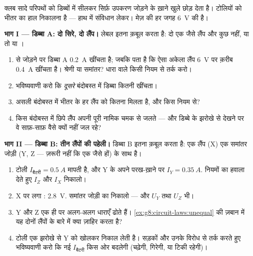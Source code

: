 \begin{problem}[{सप्ताहांत समस्या --- इलेक्ट्रॉनिकी क्लब की सीलबंद
डिब्बों वाली चुनौती; चार नियम बनाम चार पहेलियाँ; महान
लेखा}]\label{pb:g8:circuit-laws:1}
क्लब सादे परिपथों को डिब्बों में सीलकर सिर्फ़ उपकरण जोड़ने के ख़ाने
खुले छोड़ देता है। टोलियों को भीतर का हाल निकालना है --- हाथ में
संविधान लेकर। मेज़ की  हर जगह \qty{6}{V} की है।

\medskip\noindent\textbf{भाग I --- डिब्बा A: दो सिरे, दो लैंप।}
लेबल इतना क़बूल करता है: दो एक जैसे लैंप और कुछ नहीं, या तो 
या ।
\begin{enumerate}
  \item {} से जोड़ने पर डिब्बा A \qty{0.2}{A} खींचता है; जबकि पता
        है कि ऐसा अकेला लैंप \qty{6}{V} पर क़रीब \qty{0.4}{A} खींचता
        है। श्रेणी या समांतर? धारा वाले किसी नियम से तर्क करो।
  \item भविष्यवाणी करो कि \emph{दूसरे} बंदोबस्त में डिब्बा कितनी
        खींचता।
  \item असली बंदोबस्त में भीतर के हर लैंप को कितना  मिलता है,
        और किस  नियम से?
  \item किस बंदोबस्त में छिपे लैंप अपनी पूरी नामिक चमक से जलते ---
        और डिब्बे के झरोखे से देखने पर वे साफ़-साफ़ वैसे क्यों नहीं
        जल रहे?
\end{enumerate}

\medskip\noindent\textbf{भाग II --- डिब्बा B: तीन लैंपों की पहेली।}
डिब्बा B इतना क़बूल करता है: एक लैंप (X) एक समांतर जोड़ी (Y, Z ---
ज़रूरी नहीं कि एक जैसे हों) के साथ  है।
\begin{enumerate}[resume]
  \item टोली $I_{\text{बैटरी}} = \qty{0.5}{A}$ मापती है, और Y के अपने
        परख-ख़ाने पर $I_Y = \qty{0.35}{A}$. नियमों का हवाला देते हुए
        $I_Z$ और $I_X$ निकालो।
  \item X पर लगा : \qty{2.8}{V}. समांतर जोड़ी का 
        निकालो --- और $U_Y$ तथा $U_Z$ भी।
  \item Y और Z एक ही  पर अलग-अलग धाराएँ ढोते हैं।
        \cref{ex:g8:circuit-laws:unequal} की ज़बान में यह दोनों लैंपों
        के बारे में क्या ज़ाहिर करता है?
  \item टोली एक झरोखे से Y को खोलकर निकाल लेती है। सड़कों और उनके
        विरोध से तर्क करते हुए भविष्यवाणी करो कि नई
        $I_{\text{बैटरी}}$ किस ओर बदलेगी (चढ़ेगी, गिरेगी, या टिकी
        रहेगी)।
\end{enumerate}


\end{problem}
